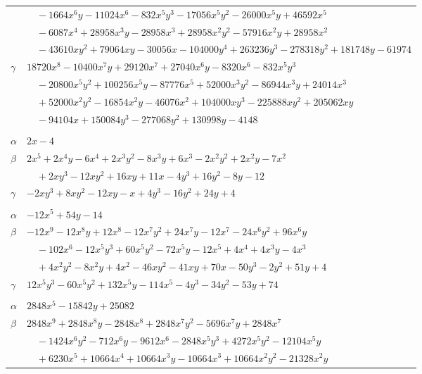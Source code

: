 \documentclass[11pt]{article}
\begin{document}
\begin{longtable}{@{}ll@{}}
 & $\quad -1664x^{6}y-11024x^{6}-832x^{5}y^{3}-17056x^{5}y^{2}-26000x^{5}y+46592x^{5}$\\
 & $\quad -6087x^{4}+28958x^{3}y-28958x^{3}+28958x^{2}y^{2}-57916x^{2}y+28958x^{2}$\\
 & $\quad -43610xy^{2}+79064xy-30056x-104000y^{4}+263236y^{3}-278318y^{2}+181748y-61974$\\
$\gamma$ & $18720x^{8}-10400x^{7}y+29120x^{7}+27040x^{6}y-8320x^{6}-832x^{5}y^{3}$\\
 & $\quad -20800x^{5}y^{2}+100256x^{5}y-87776x^{5}+52000x^{3}y^{2}-86944x^{3}y+24014x^{3}$\\
 & $\quad +52000x^{2}y^{2}-16854x^{2}y-46076x^{2}+104000xy^{3}-225888xy^{2}+205062xy$\\
 & $\quad -94104x+150084y^{3}-277068y^{2}+130998y-4148$\\
\addlinespace[3pt]
\multicolumn{2}{@{}l}{$\{i,j\}=\{14,25\}$, $k_{ij}=2^{2}\cdot 7$}\\
$\alpha$ & $2x-4$\\
$\beta$ & $2x^{5}+2x^{4}y-6x^{4}+2x^{3}y^{2}-8x^{3}y+6x^{3}-2x^{2}y^{2}+2x^{2}y-7x^{2}$\\
 & $\quad +2xy^{3}-12xy^{2}+16xy+11x-4y^{3}+16y^{2}-8y-12$\\
$\gamma$ & $-2xy^{3}+8xy^{2}-12xy-x+4y^{3}-16y^{2}+24y+4$\\
\addlinespace[3pt]
\multicolumn{2}{@{}l}{$\{i,j\}=\{14,27\}$, $k_{ij}=2\cdot 3$}\\
$\alpha$ & $-12x^{5}+54y-14$\\
$\beta$ & $-12x^{9}-12x^{8}y+12x^{8}-12x^{7}y^{2}+24x^{7}y-12x^{7}-24x^{6}y^{2}+96x^{6}y$\\
 & $\quad -102x^{6}-12x^{5}y^{3}+60x^{5}y^{2}-72x^{5}y-12x^{5}+4x^{4}+4x^{3}y-4x^{3}$\\
 & $\quad +4x^{2}y^{2}-8x^{2}y+4x^{2}-46xy^{2}-41xy+70x-50y^{3}-2y^{2}+51y+4$\\
$\gamma$ & $12x^{5}y^{3}-60x^{5}y^{2}+132x^{5}y-114x^{5}-4y^{3}-34y^{2}-53y+74$\\
\addlinespace[3pt]
\multicolumn{2}{@{}l}{$\{i,j\}=\{14,41\}$, $k_{ij}=2^{3}\cdot 3\cdot 5\cdot 7\cdot 11$}\\
$\alpha$ & $2848x^{5}-15842y+25082$\\
$\beta$ & $2848x^{9}+2848x^{8}y-2848x^{8}+2848x^{7}y^{2}-5696x^{7}y+2848x^{7}$\\
 & $\quad -1424x^{6}y^{2}-712x^{6}y-9612x^{6}-2848x^{5}y^{3}+4272x^{5}y^{2}-12104x^{5}y$\\
 & $\quad +6230x^{5}+10664x^{4}+10664x^{3}y-10664x^{3}+10664x^{2}y^{2}-21328x^{2}y$\\

\end{longtable}
\end{document}
